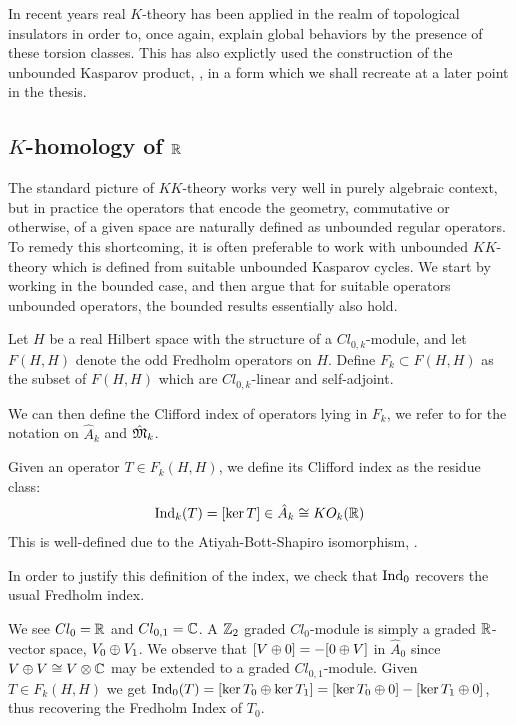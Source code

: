 In recent years real $K$-theory has been applied in the realm of topological insulators in order to, once again, explain global behaviors by the presence of these torsion classes. This has also explictly used the construction of the unbounded Kasparov product, \cite{bourne},  in a form which we shall recreate at a later point in the thesis. 
\subsection{$K$-homology of $\mathbb{R}$}
The standard picture of $KK$-theory works very well in purely algebraic context, but in practice the operators that encode the geometry, commutative or otherwise, of a given space are naturally defined as unbounded regular operators. To remedy this shortcoming, it is often preferable to work with unbounded $KK$-theory which is defined from suitable unbounded Kasparov cycles. 
We start by working in the bounded case, and then argue that for suitable operators unbounded operators, the bounded results essentially also hold.  
\begin{definition}
	Let $H$ be a real Hilbert space with the structure of a $Cl_{0,k}$-module, and let $F(H,H)$ denote the odd Fredholm operators on $H$. Define $F_k\subset F(H,H)$ as the subset of $F(H,H)$ which are $Cl_{0,k}$-linear and self-adjoint. 
\end{definition}
We can then define the Clifford index of operators lying in $F_k$, we refer to  for the notation on $\hat{A}_k$ and $\hat{\mathfrak{M}}_k$. 
\begin{definition}
	Given an operator $T\in F_k(H,H)$, we define its Clifford index as the residue class:
	\begin{align*}
		\operatorname{Ind}_k(T)=[\ker T]\in \hat{A}_k\cong KO_{k}(\mathbb{R})
	\end{align*}
	This is well-defined due to the Atiyah-Bott-Shapiro isomorphism, .
\end{definition}
In order to justify this definition of the index, we check that $\operatorname{Ind}_0$ recovers the usual Fredholm index. 
\begin{example}\label{cliffordkernel}
	We see $Cl_0=\mathbb{R}$ and $Cl_{0,1}=\mathbb{C}$. A $\mathbb{Z}_2$ graded $Cl_0$-module is simply a graded $\mathbb{R}$-vector space, $V_0\oplus V_1$. We observe that $[V\oplus 0]=-[0\oplus V]$ in $\hat{A}_0$ since $V\oplus V\cong V\otimes \mathbb{C}$ may be extended to a graded $Cl_{0,1}$-module. Given $T\in F_k(H,H)$ we get $\operatorname{Ind}_0(T)=[\ker T_0\oplus \ker T_1]=[\ker T_0 \oplus 0]-[\ker T_1 \oplus 0]$, thus recovering the Fredholm Index of $T_0$. 
\end{example}
